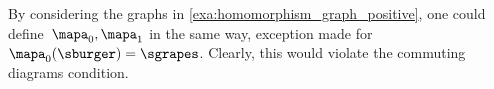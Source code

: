 \begin{example}[Counterexample]
    By considering the graphs in \cref{exa:homomorphism_graph_positive}, one could define~$\mapa_0,\mapa_1$ in the same way, exception made for~$\mapa_0(\sburger)=\sgrapes$.
    Clearly, this would violate the commuting diagrams condition.
\end{example}


\publictodomessage
{}
